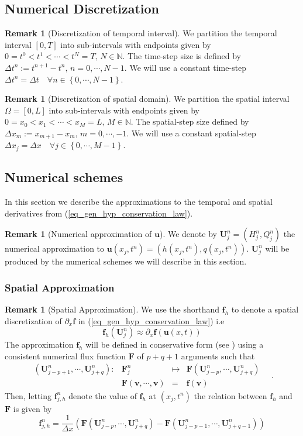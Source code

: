 \documentclass[12pt,a4paper]{article}
\numberwithin{equation}{section}
\theoremstyle{definition}
\newcommand{\W}{\ensuremath{\Omega}\xspace}
\newcommand{\dfunkmapstonumflux}[5]{\ensuremath{
		\begin{array}{rccl}
			{#1}: & {#2} &\mapsto&{#3}
			\\
			& {#4} &=&{#5}
		\end{array}\quad}}
\newcommand{\vect}[1]{\textbf{#1}}
\newcommand{\qp}[1]{\left(#1\right)}
\newcommand{\qb}[1]{\left[#1\right]}
\newcommand{\bracegs}[1]{\left\lbrace#1\right\rbrace}
\newtheorem{Rem}[subsection]{Remark}
\begin{document}
\subsection{Numerical Discretization}
\begin{Rem}[Discretization of temporal interval]
	We  partition the temporal interval $\qb{0,T}$ into sub-intervals with endpoints given by $0=t^0<t^1<\cdots<t^N=T,\, N\in \mathbb{N}$.    The time-step size is defined by $\Delta t^n:=t^{n+1}-t^n,\, n=0,\cdots,N-1$.    We will use a constant time-step $\Delta t^n=\Delta t \quad \forall n\in \bracegs{0,\cdots, N-1}$.
\end{Rem}
\begin{Rem}[Discretization of spatial domain]
We partition the spatial interval $\W=\qb{0,L}$ into sub-intervals with endpoints given by $0=x_0<x_1<\cdots<x_M=L,\, M\in \mathbb{N}$.  The spatial-step size  defined by $\Delta x_m:=x_{m+1}-x_m,\, m=0,\cdots,-1$.   We will use a constant spatial-step  $\Delta x_j =\Delta x \quad \forall j\in \bracegs{0,\cdots,M-1}$.
\end{Rem}
\subsection{Numerical schemes}
In this section we describe the approximations to the temporal and spatial derivatives from (\ref{eq_gen_hyp_conservation_law}).  
\begin{Rem}[Numerical approximation of $\vect{u}$]  We denote by $\vect{U}^n_j=\qp{H^n_j, Q^n_j}$ the numerical approximation to $\vect{u}\qp{x_j,t^n}=\qp{h\qp{x_j,t^n},q\qp{x_j,t^n}}$.  $\vect{U}^n_j$ will be produced by the numerical schemes we will describe in this section.  
\end{Rem}
\subsubsection{Spatial Approximation}
\begin{Rem}[Spatial Approximation]
We use the shorthand $\vect{f}_h$ to denote a spatial discretization of $\partial_x\vect{f}$ in (\ref{eq_gen_hyp_conservation_law}) i.e
\begin{equation}
\vect{f}_h\qp{\vect{U}^n_j}\approx\partial_x\vect{f}\qp{\vect{u}\qp{x,t}}
\end{equation}
The approximation $\vect{f}_h$ will be defined in  conservative form (see \cite[\S12]{leveque1992numerical}) using a consistent numerical flux function $\vect{F}$ of $p+q+1$ arguments such that
\begin{equation}\label{eq_defn_num_flux}
\dfunkmapstonumflux{\qp{\vect{U}^n_{j-p+1},\cdots,\vect{U}^n_{j+q}}}{\vect{F}^n_j}{\vect{F}\qp{\vect{U}^n_{j-p},\cdots,\vect{U}^n_{j+q}}}{\vect{F}\qp{\vect{v},\cdots,\vect{v}}}{\vect{f}\qp{\vect{v}}}.
\end{equation}
Then, letting $\vect{f}^n_{j,h}$ denote the value of $\vect{f}_h$ at $\qp{x_j, t^n}$ the relation between $\vect{f}_h$ and $\vect{F}$ is given by 
\begin{equation}
\vect{f}^n_{j,h}=\frac{1}{\Delta x}\qp{{\vect{F}\qp{\vect{U}^n_{j-p},\cdots,\vect{U}^n_{j+q}}}-{\vect{F}\qp{\vect{U}^n_{j-p-1},\cdots,\vect{U}^n_{j+q-1}}}}
\end{equation}
\end{Rem}
\end{document}
